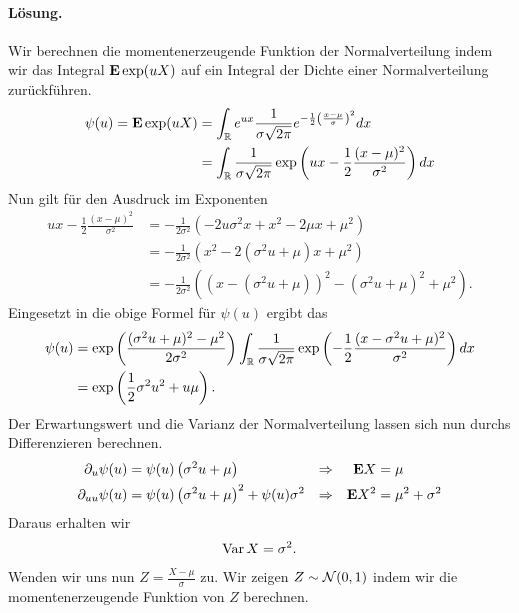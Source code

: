 \paragraph*{Lösung.} Wir berechnen die momentenerzeugende Funktion der
Normalverteilung indem wir das Integral $\mathbf{E} \exp (u X)$ auf ein Integral der
Dichte einer Normalverteilung zurückführen. 
\begin{align*}
    \psi(u) = \mathbf{E} \exp (u X)
    &= \int_{\mathbb R}^{} e^{ux } \frac{1}{\sigma \sqrt{2\pi}} 
    e^{ -\frac{1}{2}\left( \frac{x-\mu}{\sigma} \right)^2} dx \\
    &= \int_{\mathbb R}^{} \frac{1}{\sigma \sqrt{2\pi}} 
    \exp \left( ux - \frac{1}{2} \frac{(x-\mu)^2}{\sigma^2} \right) dx
\end{align*}
Nun gilt für den Ausdruck im Exponenten
\begin{align*}
    ux - \frac{1}{2} \frac{(x-\mu)^2}{\sigma^2} &= 
    -\frac{1}{2\sigma^2} \left( -2 u\sigma^2 x + x^2 - 2\mu x + \mu^2 \right) \\
    &= -\frac{1}{2\sigma^2} \left( x^2 - 2( \sigma^2 u +\mu  )x + \mu^2  \right)  \\
    &= -\frac{1}{2\sigma^2} \left( \left( x - (\sigma^2 u + \mu) \right)^2 
    - (\sigma^2 u + \mu)^2 + \mu^2  \right).
\end{align*}
Eingesetzt in die obige Formel für $\psi(u)$ ergibt das 
\begin{align*}
    \psi(u) &=  \exp \left( \frac{ (\sigma^2 u + \mu)^2 - \mu^2 }{2 \sigma^2} \right)
    \int_{\mathbb R}^{} \frac{1}{\sigma \sqrt{2\pi}} 
    \exp \left( - \frac{1}{2} \frac{(x- \sigma^2 u + \mu)^2}{\sigma^2} \right) dx \\
    &= \exp \left( \frac{1}{2} \sigma^2 u^2 + u \mu \right).
\end{align*}
Der Erwartungswert und die Varianz der Normalverteilung lassen sich nun durchs
Differenzieren berechnen. 
\begin{align*}
    \partial_u \psi(u) &= \psi(u) \left( \sigma^2 u + \mu \right) &\Rightarrow && \mathbf{E} X &= \mu \\
    \partial_{uu} \psi(u) &= \psi(u) \left( \sigma^2 u + \mu \right)^2 + \psi(u) \sigma^2
    & \Rightarrow && \mathbf{E} X^2 &= \mu^2 + \sigma^2
\end{align*}
Daraus erhalten wir 
\begin{align*}
    \operatorname{Var} X = \sigma^2.
\end{align*}
Wenden wir uns nun $Z = \frac{X - \mu}{\sigma}$ zu. Wir zeigen $Z \sim \mathcal N(0,1)$ 
indem wir die momentenerzeugende Funktion von $Z$ berechnen.
